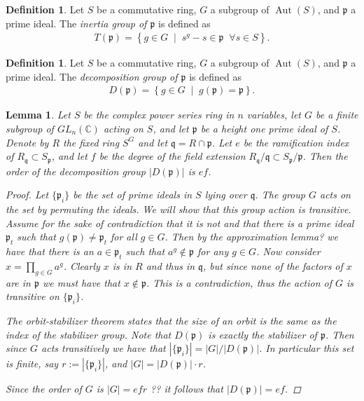 \documentclass[11pt, a4paper, english]{article}
\newtheorem{lemma}[theorem]{Lemma}
\theoremstyle{definition}
\newtheorem{defin}[theorem]{Definition}
\newcommand{\C}{\mathbb{C}}
\DeclareMathOperator{\Aut}{Aut}
\begin{document}
\begin{defin}
Let $S$ be a commutative ring, $G$ a subgroup of $\Aut(S)$, and $\mathfrak{p}$ a prime ideal. The \textit{inertia group of $\mathfrak{p}$} is defined as
\begin{align*}
T(\mathfrak{p}) = \left\lbrace g \in G \; \middle| \; s^g - s \in \mathfrak{p} \;\; \forall s \in S \right\rbrace.
\end{align*}
\end{defin}

\begin{defin}
Let $S$ be a commutative ring, $G$ a subgroup of $\Aut(S)$, and $\mathfrak{p}$ a prime ideal. The \textit{decomposition group of $\mathfrak{p}$} is defined as
\begin{align*}
D(\mathfrak{p}) = \left\lbrace g \in G \; \middle| \; g(\mathfrak{p}) = \mathfrak{p} \right\rbrace.
\end{align*}
\end{defin}

\begin{lemma}
Let $S$ be the complex power series ring in $n$ variables, let $G$ be  a finite subgroup of $GL_n(\C)$ acting on $S$, and let $\mathfrak{p}$ be a height one prime ideal of $S$. Denote by $R$ the fixed ring $S^G$ and let $\mathfrak{q} = R \cap \mathfrak{p}$. Let $e$ be the ramification index of $R_\mathfrak{q} \subset S_\mathfrak{p}$, and let $f$ be the degree of the field extension $R_\mathfrak{q}/\mathfrak{q} \subset S_\mathfrak{p}/\mathfrak{p}$. Then the order of the decomposition group $|D(\mathfrak{p})|$ is $ef$.

\begin{proof}
Let $\{ \mathfrak{p}_i \}$ be the set of prime ideals in $S$ lying over $\mathfrak{q}$. The group $G$ acts on the set by permuting the ideals. We will show that this group action is transitive. Assume for the sake of contradiction that it is not and that there is a prime ideal $\mathfrak{p}_t$ such that $g(\mathfrak{p}) \neq \mathfrak{p}_t$ for all $g \in G$. Then by the {\color{red} approximation lemma?} we have that there is an $a \in \mathfrak{p}_t$ such that $a^g \not\in \mathfrak{p}$ for any $g \in G$. Now consider $x = \prod_{g \in G} a^g$. Clearly $x$ is in $R$ and thus in $\mathfrak{q}$, but since none of the factors of $x$ are in $\mathfrak{p}$ we must have that $x \not\in \mathfrak{p}$. This is a contradiction, thus the action of $G$ is transitive on $\{ \mathfrak{p}_i \}$.

The orbit-stabilizer theorem states that the size of an orbit is the same as the index of the stabilizer group. Note that $D(\mathfrak{p})$ is exactly the stabilizer of $\mathfrak{p}$. Then since $G$ acts transitively we have that $|\{ \mathfrak{p}_i \}| = |G|/|D(\mathfrak{p})|$. In particular this set is finite, say $r := |\{ \mathfrak{p}_i \}|$, and $|G| = |D(\mathfrak{p})|\cdot r$.

Since the order of $G$ is $|G|=efr$ {\color{red} ??} it follows that $|D(\mathfrak{p})| = ef$.
\end{proof}
\end{lemma}
\end{document}
